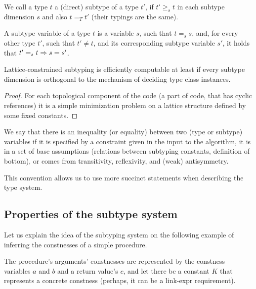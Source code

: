 \begin{defn}
    We call a type $t$ a (direct) subtype of a type $t'$, if $t' \geq_s t$ in each subtype dimension $s$ and also $t =_T t'$ (their typings are the same).
\end{defn}

\begin{defn}
    A subtype variable of a type $t$ is a variable $s$, such that $t =_s s$, and, for every other type $t'$, such that $t' \neq t$, and its corresponding subtype variable $s'$, it holds that $t' =_s t \Rightarrow s = s'$.
\end{defn}

\begin{lemma}
    Lattice-constrained subtyping is efficiently computable at least if every subtype dimension is orthogonal to the mechanism of deciding type class instances.
\end{lemma}

\begin{proof}
    For each topological component of the code (a part of code, that has cyclic references) it is a simple minimization problem on a lattice structure defined by some fixed constants.
\end{proof}

\begin{remark}
    We say that there is an inequality (or equality) between two (type or subtype) variables if it is specified by a constraint given in the input to the algorithm, it is in a set of base assumptions (relations between subtyping constants, definition of bottom), or comes from transitivity, reflexivity, and (weak) antisymmetry.

    This convention allows us to use more succinct statements when describing the type system.
\end{remark}

\subsection{Properties of the subtype system}
\label{subtyping-idea}

Let us explain the idea of the subtyping system on the following example of inferring the constnesses of a simple procedure.

The procedure's arguments' constnesses are represented by the constness variables $a$ and $b$ and a return value's $c$, and let there be a constant $K$ that represents a concrete constness (perhaps, it can be a link-expr requirement).

